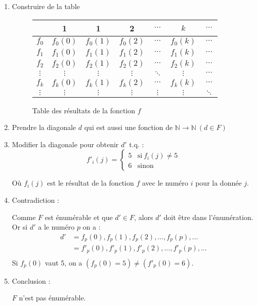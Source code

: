 \begin{enumerate}
\item Construire de la table
	\begin{figure}[H]
    		\centering
    		\begin{tabular}{c|cccccc}
		 & 1 & 1 & 2 & $\cdots$ & $k$ & $\cdots$ \\ 
		\hline 
		$f_0$ & $f_0(0)$ & $f_0(1)$ & $f_0(2)$ & $\cdots$ & $f_0(k)$ & $\cdots$ \\ 
		$f_1$ & $f_1(0)$ & $f_1(1)$ & $f_1(2)$ & $\cdots$ & $f_1(k)$ & $\cdots$ \\ 
		$f_2$ & $f_2(0)$ & $f_2(1)$ & $f_2(2)$ & $\cdots$ & $f_2(k)$ & $\cdots$ \\ 
		$\vdots$ & $\vdots$ & $\vdots$ & $\vdots$ & $\ddots$ & $\vdots$ & $\cdots$ \\ 
		$f_k$ & $f_k(0)$ & $f_k(1)$ & $f_k(2)$ & $\cdots$ & $f_k(k)$ & $\cdots$ \\ 
		$\vdots$ & $\vdots$ & $\vdots$ & $\vdots$ & $\vdots$ & $\vdots$ & $\ddots$ \\ 
		\end{tabular}
		\caption{Table des résultats de la fonction $f$}
	\end{figure}
\item Prendre la diagonale $d$ qui est aussi une fonction de $\mathbb{N} \rightarrow \mathbb{N} \ (d \in F)$
\item Modifier la diagonale pour obtenir $d'$ t.q. :
	\begin{equation*}
		f'_i(j)=
		\begin{cases}
      		5 & \text{si}\ f_i(j) \neq 5\\
      		6 & \text{sinon}\
      	\end{cases}
    \end{equation*}
    
    Où $f_i(j)$ est le résultat de la fonction $f$ avec le numéro $i$ pour la donnée $j$.
\item Contradiction :

	Comme $F$ est énumérable et que $d' \in F$, alors $d'$ doit être dans l'énumération. Or si $d'$ a le numéro $p$ on a :
	\begin{align*}
		d' &= f_p(0),f_p(1),f_p(2),\ldots,f_p(p),\ldots\\
		   &= f'_p(0),f'_p(1),f'_p(2),\ldots,f'_p(p),\ldots\\
    \end{align*}
    Si $f_p(0)$ vaut 5, on a $(f_p(0) = 5) \neq (f'_p(0) = 6)$.
\item Conclusion :

	$F$ n'est pas énumérable.
\end{enumerate}

